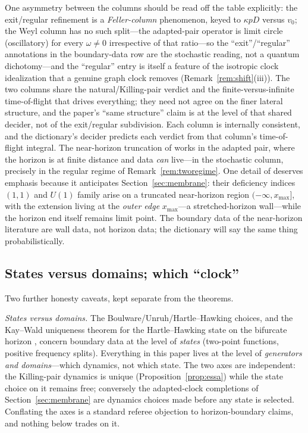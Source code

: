 \documentclass[11pt]{article}
\theoremstyle{definition}
\theoremstyle{remark}
\begin{document}
\noindent
One asymmetry between the columns should be read off the table
explicitly: the exit/regular refinement is a \emph{Feller-column}
phenomenon, keyed to $\kappa pD$ versus $v_{0}$; the Weyl column has no
such split---the adapted-pair operator is limit circle (oscillatory)
for every $\omega\neq0$ irrespective of that ratio---so the
``exit''/``regular'' annotations in the boundary-data row are the
stochastic reading, not a quantum dichotomy---and the ``regular'' entry
is itself a feature of the isotropic clock idealization that a genuine
graph clock removes (Remark~\ref{rem:shift}(iii)). The two columns share the
natural/Killing-pair verdict and the finite-versus-infinite
time-of-flight that drives everything; they need not agree on the finer
lateral structure, and the paper's ``same structure'' claim is at the
level of that shared decider, not of the exit/regular subdivision.
Each column is internally consistent, and the dictionary's decider
predicts each verdict from that column's time-of-flight integral. The
near-horizon truncation of
\cite{GuptaSen2002,CamblongOrdonez2005} works in the
adapted pair, where the horizon is at finite distance and data
\emph{can} live---in the stochastic column, precisely in the regular
regime of Remark~\ref{rem:tworegime}. One detail of
\cite{Balachandran2018} deserves emphasis because it anticipates
Section~\ref{sec:membrane}: their deficiency indices $(1,1)$ and
$U(1)$ family arise on a truncated near-horizon region
$(-\infty,x_{\max}]$, with the extension living at the \emph{outer
edge} $x_{\max}$---a stretched-horizon wall---while the horizon end
itself remains limit point. The boundary data of the near-horizon
literature are wall data, not horizon data; the dictionary will say
the same thing probabilistically.

\subsection{States versus domains; which ``clock''}
\label{subsec:whichclock}

Two further honesty caveats, kept separate from the theorems.

\emph{States versus domains.} The Boulware/Unruh/Hartle--Hawking
choices, and the Kay--Wald uniqueness theorem for the Hartle--Hawking
state on the bifurcate horizon \cite{KayWald1991}, concern boundary
data at the level of \emph{states} (two-point functions, positive
frequency splits). Everything in this paper lives at the level of
\emph{generators and domains}---which dynamics, not which state. The
two axes are independent: the Killing-pair dynamics is unique
(Proposition~\ref{prop:essa}) while the state choice on it remains
free; conversely the adapted-clock completions of
Section~\ref{sec:membrane} are dynamics choices made before any state
is selected. Conflating the axes is a standard referee objection to
horizon-boundary claims, and nothing below trades on it.
\end{document}
